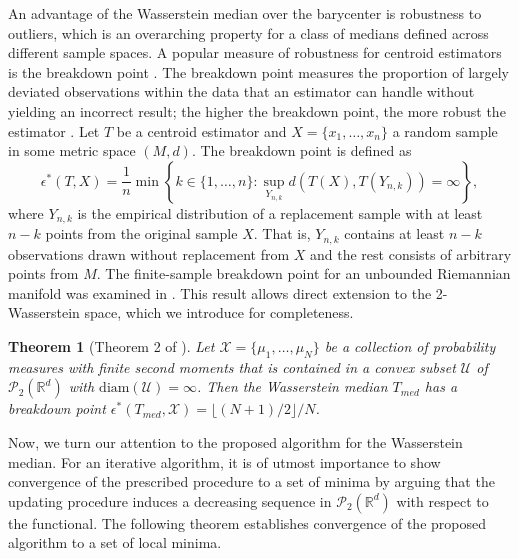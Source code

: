 \documentclass[11pt]{article}
\newcommand{\calP}{\mathcal{P}}
\newcommand{\bbR}{\mathbb{R}}
\newtheorem{theorem}{Theorem}
\begin{document}
An advantage of the Wasserstein median over the barycenter is robustness to outliers, which is an overarching property for a class of medians defined across different sample spaces. A popular measure of robustness for centroid estimators is the breakdown point \citep{hampel_1971_GeneralQualitativeDefinition}. The breakdown point measures the proportion of largely deviated observations within the data that an estimator can handle without yielding an incorrect result; the higher the breakdown point, the more robust the estimator \citep{rousseeuw_1987_RobustRegressionOutlier}. Let $T$ be a centroid estimator and $X = \lbrace x_1, \ldots, x_n \rbrace$ a random sample in some metric space $(M, d)$. The breakdown point is defined as 
\begin{equation*}
	\epsilon^* (T, X) = \frac{1}{n} \min \left\lbrace  k \in \lbrace 1, \ldots, n\rbrace: \sup_{Y_{n,k}} d(T(X), T(Y_{n,k})) = \infty \right\rbrace,
\end{equation*}
where $Y_{n,k}$ is the empirical distribution of a replacement sample with at least $n-k$ points from the original sample $X$. That is, $Y_{n,k}$ contains at least $n-k$ observations drawn without replacement from $X$ and the rest consists of arbitrary points from $M$. The finite-sample breakdown point for an unbounded Riemannian manifold was examined in \cite{fletcher_2009_GeometricMedianRiemannian}. This result allows direct extension to the 2-Wasserstein space, which we introduce for completeness.

\begin{theorem}[Theorem 2 of \cite{fletcher_2009_GeometricMedianRiemannian}]\label{theory:BreakdownPoint}
	Let $\mathcal{X} = \lbrace \mu_1, \ldots, \mu_N \rbrace$ be a collection of probability measures with finite second moments that is contained in a convex subset $\mathcal{U}$ of $\calP_2(\mathbb{R}^d)$ with $\textrm{diam}(\mathcal{U}) = \infty$. Then the Wasserstein median  $T_{med}$ has a breakdown point $\epsilon^*(T_{med}, \mathcal{X}) = \lfloor (N+1)/2\rfloor/N$.
\end{theorem}





Now, we turn our attention to the proposed algorithm for the Wasserstein median. For an iterative algorithm, it is of utmost importance to show convergence of the prescribed procedure to a set of minima by arguing that the updating procedure induces a decreasing sequence in $\calP_2 (\bbR^d)$ with respect to the functional. The following theorem establishes convergence of the proposed algorithm to a set of local minima. 
\end{document}

